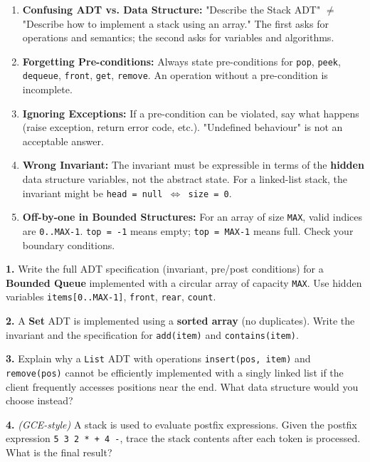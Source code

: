 \documentclass[11pt]{article}
\begin{document}
\begin{attention}
\begin{enumerate}
    \item \textbf{Confusing ADT vs. Data Structure:} "Describe the Stack ADT" $\neq$ "Describe how to implement a stack using an array." The first asks for operations and semantics; the second asks for variables and algorithms.
    \item \textbf{Forgetting Pre-conditions:} Always state pre-conditions for \texttt{pop}, \texttt{peek}, \texttt{dequeue}, \texttt{front}, \texttt{get}, \texttt{remove}. An operation without a pre-condition is incomplete.
    \item \textbf{Ignoring Exceptions:} If a pre-condition can be violated, say what happens (raise exception, return error code, etc.). "Undefined behaviour" is not an acceptable answer.
    \item \textbf{Wrong Invariant:} The invariant must be expressible in terms of the \textbf{hidden} data structure variables, not the abstract state. For a linked-list stack, the invariant might be \texttt{head = null $\iff$ size = 0}.
    \item \textbf{Off-by-one in Bounded Structures:} For an array of size \texttt{MAX}, valid indices are \texttt{0..MAX-1}. \texttt{top = -1} means empty; \texttt{top = MAX-1} means full. Check your boundary conditions.
\end{enumerate}
\end{attention}

\begin{exercice}
\textbf{1.} Write the full ADT specification (invariant, pre/post conditions) for a \textbf{Bounded Queue} implemented with a circular array of capacity \texttt{MAX}. Use hidden variables \texttt{items[0..MAX-1]}, \texttt{front}, \texttt{rear}, \texttt{count}.

\textbf{2.} A \textbf{Set} ADT is implemented using a \textbf{sorted array} (no duplicates). Write the invariant and the specification for \texttt{add(item)} and \texttt{contains(item)}.

\textbf{3.} Explain why a \texttt{List} ADT with operations \texttt{insert(pos, item)} and \texttt{remove(pos)} cannot be efficiently implemented with a singly linked list if the client frequently accesses positions near the end. What data structure would you choose instead?

\textbf{4.} \textit{(GCE-style)} A stack is used to evaluate postfix expressions. Given the postfix expression \texttt{5 3 2 * + 4 -}, trace the stack contents after each token is processed. What is the final result?
\end{exercice}
\end{document}
